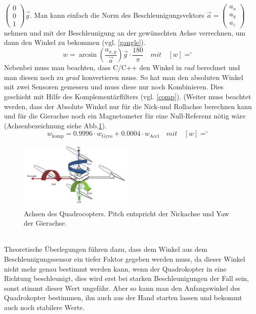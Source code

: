 \documentclass[12pt,a4paper, ngerman]{article}
\begin{document}
$
\begin{pmatrix}
0\\ 
0\\ 
1
\end{pmatrix}
\vec{g}
$. Man kann einfach die Norm des Beschleunigungsvektors $\vec{a} = \begin{pmatrix}
a_{x}\\ 
a_{y}\\ 
a_{z}
\end{pmatrix}$ nehmen und mit der Beschleunigung an der gewünschten Achse verrechnen, um dann den Winkel zu bekommen (vgl. \ref{gangle}).
\begin{equation}\label{gangle}
w=\arcsin(\frac{a_{x,y}}{\vec{a}}
)
\vec{g}\cdot \frac{180}{\pi} \quad mit \quad [w]=^\circ
\end{equation}
Nebenbei muss man beachten, dass C/C++ den Winkel in $rad$ berechnet und man diesen noch zu $grad$ konvertieren muss. So hat man den absoluten Winkel mit zwei Sensoren gemessen und muss diese nur noch Kombinieren. Dies geschieht mit Hilfe des Komplementärflilters (vgl. \ref{comp})\cite{website:Digikey_Komplementaerfilter}. (Weiter muss beachtet werden, dass der Absolute Winkel nur für die Nick-und Rollachse berechnen kann und für die Gierachse noch ein Magnetometer für eine Null-Referenz nötig wäre (Achsenbezeichnung siehe Abb.\ref{ypr}).
\begin{equation}\label{comp}
w_{\text{komp}}=0.9996\cdot w_{\text{Gyro}}+0.0004\cdot w_{\text{Accl}} \quad mit \quad [w]=^\circ
\end{equation}
\begin{figure}[h!]
\centering
\includegraphics[width=0.5\textwidth]{ypr.png}
\caption[\url{https://technikblog.ch/wp-content/uploads/2013/03/Roll-Pitch-_Yaq-Quadcopter.png}]{Achsen des Quadrocopters. Pitch entspricht der Nickachse und Yaw der Gierachse.}\label{ypr}
\end{figure} \\
Theoretische Überlegungen führen dazu, dass dem Winkel aus dem Beschleunigungssensor ein tiefer Faktor gegeben werden muss, da dieser Winkel nicht mehr genau bestimmt werden kann, wenn der Quadrokopter in eine Richtung beschleunigt, dies wird erst bei starken Beschleunigungen der Fall sein, sonst stimmt dieser Wert ungefähr. Aber so kann man den Anfangswinkel des Quadrokopter bestimmen, ihn auch aus der Hand starten lassen und bekommt auch noch stabilere Werte.\\ \\
\end{document}
